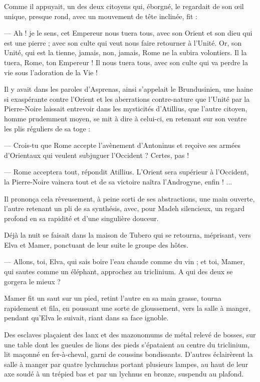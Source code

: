 \documentclass[a4paper, 11pt, oneside, polutonikogreek, french]{article}
\begin{document}
Comme il appuyait, un des deux citoyens qui, éborgné, le regardait de son œil unique, presque rond, avec un mouvement de tête inclinée, fit :

--- Ah ! je le sens, cet Empereur nous tuera tous, avec son Orient et son dieu qui est une pierre ; avec son culte qui veut nous faire retourner à l'Unité. Or, son Unité, qui est la tienne, jamais, non, jamais, Rome ne la subira volontiers. Il la tuera, Rome, ton Empereur ! Il nous tuera tous, avec son culte qui va perdre la vie sous l'adoration de la Vie !

Il y avait dans les paroles d'Asprenas, ainsi s'appelait le Brundusinien, une haine si exaspérante contre l'Orient et les aberrations contre-nature que l'Unité par la Pierre-Noire laissait entrevoir dans les mysticités d'Atillius, que l'autre citoyen, homme prudemment moyen, se mit à dire à celui-ci, en retenant sur son ventre les plis réguliers de sa toge :

--- Crois-tu que Rome accepte l'avènement d'Antoninus et reçoive ses armées d'Orientaux qui veulent subjuguer l'Occident ? Certes, pas !

--- Rome acceptera tout, répondit Atillius. L'Orient sera supérieur à l'Occident, la Pierre-Noire vaincra tout et de sa victoire naîtra l'Androgyne, enfin ! ...

Il prononça cela rêveusement, à peine sorti de ses abstractions, une main ouverte, l'autre retenant un pli de sa synthésis, avec, pour Madeh silencieux, un regard profond en sa rapidité et d'une singulière douceur.

Déjà la nuit se faisait dans la maison de Tubero qui se retourna, méprisant, vers Elva et Mamer, ponctuant de leur suite le groupe des hôtes.

--- Allons, toi, Elva, qui sais boire l'eau chaude comme du vin ; et toi, Mamer, qui sautes comme un éléphant, approchez au triclinium. A qui des deux se gorgera le mieux ?

Mamer fit un saut sur un pied, retint l'autre en sa main grasse, tourna rapidement et fila, en poussant une sorte de gloussement, vers la salle à manger, pendant qu'Elva le suivait, riant dans sa face ignoble.

Des esclaves plaçaient des lanx et des mazonomums de métal relevé de bosses, sur une table dont les gueules de lions des pieds s'épataient au centre du triclinium, lit maçonné en fer-à-cheval, garni de coussins bondissants. D'autres éclairèrent la salle à manger par quatre lychnuchus portant plusieurs lampes, au haut de leur axe soudé à un trépied bas et par un lychnus en bronze, suspendu au plafond.
\end{document}
